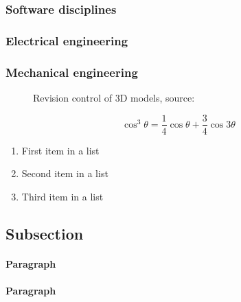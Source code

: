 \documentclass[fleqn,10pt]{SelfArx} %
\begin{document}
\subsubsection{Software disciplines}

\subsubsection{Electrical engineering}

\subsubsection{Mechanical engineering}

\begin{figure*}[ht]\centering %
\caption{Revision control of 3D models, source: \citeauthor{skalnik_3d_2013}\cite{skalnik_3d_2013}}
\label{fig:view}
\end{figure*}

\lipsum[4] %

\begin{equation}
\cos^3 \theta =\frac{1}{4}\cos\theta+\frac{3}{4}\cos 3\theta
\label{eq:refname2}
\end{equation}

\lipsum[5] %

\begin{enumerate}[noitemsep] %
\item First item in a list
\item Second item in a list
\item Third item in a list
\end{enumerate}

\subsection{Subsection}

\lipsum[6] %

\paragraph{Paragraph} \lipsum[7] %
\paragraph{Paragraph} \lipsum[8] %
\end{document}
